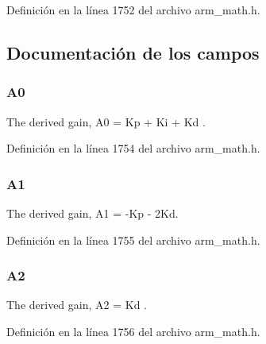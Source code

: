 Definición en la línea 1752 del archivo arm\+\_\+math.\+h.



\subsection{Documentación de los campos}
\subsubsection[{\texorpdfstring{A0}{A0}}]{ A0}\hypertarget{structarm__pid__instance__q31_ab58496a4137da4c667915a5fc0ef57ef}{}\label{structarm__pid__instance__q31_ab58496a4137da4c667915a5fc0ef57ef}
The derived gain, A0 = Kp + Ki + Kd . 

Definición en la línea 1754 del archivo arm\+\_\+math.\+h.

\subsubsection[{\texorpdfstring{A1}{A1}}]{ A1}\hypertarget{structarm__pid__instance__q31_aeb897c84724b56948e4222aca8d0e1f4}{}\label{structarm__pid__instance__q31_aeb897c84724b56948e4222aca8d0e1f4}
The derived gain, A1 = -\/\+Kp -\/ 2\+Kd. 

Definición en la línea 1755 del archivo arm\+\_\+math.\+h.

\subsubsection[{\texorpdfstring{A2}{A2}}]{ A2}\hypertarget{structarm__pid__instance__q31_a4ae945f839719fb2c04c978724b78ebb}{}\label{structarm__pid__instance__q31_a4ae945f839719fb2c04c978724b78ebb}
The derived gain, A2 = Kd . 

Definición en la línea 1756 del archivo arm\+\_\+math.\+h.

